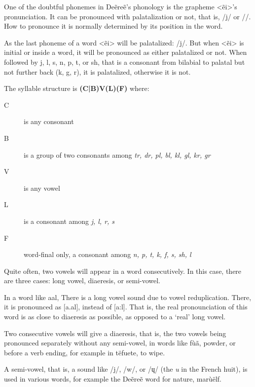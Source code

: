 One of the doubtful phonemes in Deẽreẽ’s phonology is the grapheme <ẽi>’s pronunciation. It can be pronounced with palatalization or not, that is, /{\ipaET}j/ or /\ipaET/. How to pronounce it is normally determined by its position in the word.

As the last phoneme of a word <ẽi> will be palatalized: /{\ipaET}j/. But when <ẽi> is initial or inside a word, it will be pronounced as either palatalized or not. When followed by j, l, s, n, p, t, or sh, that is a consonant from bilabial to palatal but not further back (k, g, r), it is palatalized, otherwise it is not.

The syllable structure is \textbf{(C|B)V(L)(F)} where:
\begin{description}
\item[C] is any consonant
\item[B] is a group of two consonants among \emph{tr, dr, pl, bl, kl, gl, kr, gr}
\item[V] is any vowel
\item[L] is a consonant among \emph{j, l, r, s}
\item[F] word-final only, a consonant among \emph{n, p, t, k, f, s, sh, l}
\end{description}

Quite often, two vowels will appear in a word consecutively. In this case, there are three cases: long vowel, diaeresis, or semi-vowel.

In a word like \gls{aal}, There is a long vowel sound due to vowel reduplication. There, it is pronounced as [a.al], instead of [a:l]. That is, the real pronounciation of this word is as close to diaeresis as possible, as opposed to a ‘real’ long vowel.

Two consecutive vowels will give a diaeresis, that is, the two vowels being pronounced separately without any semi-vowel, in words like \gls{fùã}, powder, or before a verb ending, for example in \gls{tëfuete}, to wipe.

A semi-vowel, that is, a sound like /j/, /w/, or /ɥ/ (the \emph{u} in the French huit), is used in various words, for example the Deẽreẽ word for nature, \gls{marùëlf}.

